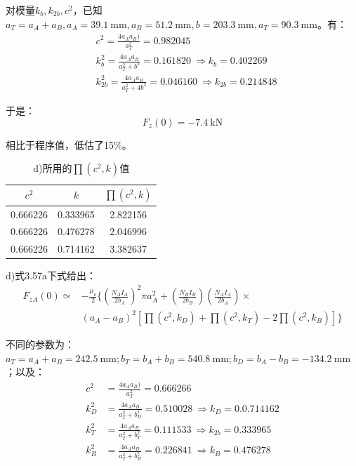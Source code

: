 对模量$k_b, k_{2b},c^2$，已知$a_T = a_A+a_B, a_A = 39.1\ \mathrm{mm}, a_B = 51.2\ \mathrm{mm}, b =203.3\ \mathrm{mm}, a_T=90.3\ \mathrm{mm}$。有：
\begin{align*}
&c^2=\frac{4a_A a_B)}{a_T^2}=0.982045\\
&k_b^2=\frac{4a_A a_B}{a_T^2+b^2}=0.161820\ \Rightarrow k_b=0.402269\\
&k_{2b}^2=\frac{4a_A a_B}{a_T^2+4b^2}=0.046160\ \Rightarrow k_{2b}=0.214848
\end{align*}

于是：
$$F_z(0)=-7.4\ \mathrm{kN}$$

相比于程序值，低估了15\%。

\begin{table}[htbp]\small
\centering
\caption{d)所用的$\prod(c^2,k)$值}
	\begin{tabular}{|c|c|c|}
		\hline
		$c^2$      &$k$  & $\prod(c^2,k)$        \\ \hline
		0.666226 & 0.333965 & 2.822156 \\ \hline
		0.666226 & 0.476278 & 2.046996 \\ \hline
		0.666226 & 0.714162 & 3.382637 \\ \hline
	\end{tabular}
\end{table}

d)式3.57a下式给出：
\begin{equation*}
\begin{split}
F_{zA}(0)\simeq&-\frac{\mu_{o}}{2}\{(\frac{N_{A}I_{A}}{2b_{A}})^{2}\pi a_{A}^{2}+(\frac{N_{B}I_{B}}{2b_{B}})(\frac{N_{A}I_{A}}{2b_{A}})\times\\
&(a_{A}-a_{B})^{2}[\prod(c^{2},k_{D})+\prod(c^{2},k_{T})-2\prod(c^{2},k_{B})]\}%
\end{split}\tag{3.57a}
\end{equation*}

不同的参数为：$a_T=a_A+a_B=242.5 \ \mathrm{mm};b_T=b_A+b_B=540.8 \ \mathrm{mm}; b_D=b_A−b_B=−134.2 \ \mathrm{mm}$；以及：
\begin{align*}
c^2&=\frac{4a_A a_B)}{a_T^2}=0.666266\\
k_D^2&=\frac{4a_A a_B}{a_T^2+b_D^2}=0.510028\ \Rightarrow k_D=0.0.714162\\
k_{T}^2&=\frac{4a_A a_B}{a_T^2+b_T^2}=0.111533\ \Rightarrow k_{2b}=0.333965\\
k_B^2&=\frac{4a_A a_B}{a_T^2+b_B^2}=0.226841\ \Rightarrow k_{B}=0.476278
\end{align*}


